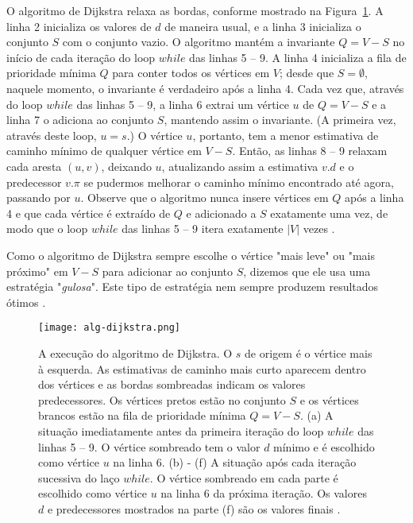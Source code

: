 O algoritmo de Dijkstra relaxa as bordas, conforme mostrado na Figura~\ref{sec3:alg-dijkstra}. A linha 2 inicializa os valores de $d$ de maneira usual, e a linha 3 inicializa o conjunto $S$ com o conjunto vazio. O algoritmo mantém a invariante $Q = V - S$ no início de cada iteração do loop $while$ das linhas 5 – 9. A linha 4 inicializa a fila de prioridade mínima $Q$ para conter todos os vértices em $V$; desde que $S = \emptyset$, naquele momento, o invariante é verdadeiro após a linha 4. Cada vez que, através do loop $while$ das linhas 5 – 9, a linha 6 extrai um vértice $u$ de $Q = V - S$ e a linha 7 o adiciona ao conjunto $S$, mantendo assim o invariante. (A primeira vez, através deste loop, $u = s$.) O vértice $u$, portanto, tem a menor estimativa de caminho mínimo de qualquer vértice em $V - S$. Então, as linhas 8 – 9 relaxam cada aresta $(u, v)$, deixando $u$, atualizando assim a estimativa $v.d$ e o predecessor $v.\pi$ se pudermos melhorar o caminho mínimo encontrado até agora, passando por $u$. Observe que o algoritmo nunca insere vértices em $Q$ após a linha 4 e que cada vértice é extraído de $Q$ e adicionado a $S$ exatamente uma vez, de modo que o loop $while$ das linhas 5 – 9 itera exatamente $\left\lvert V\right\rvert$ vezes \cite{cormen2009}.

Como o algoritmo de Dijkstra sempre escolhe o vértice "mais leve" ou "mais próximo" em $V - S$ para adicionar ao conjunto $S$, dizemos que ele usa uma estratégia "\emph{gulosa}". Este tipo de estratégia nem sempre produzem resultados ótimos \cite{cormen2009}.

\begin{figure}[!htb]
    \centering
    \texttt{[image: alg-dijkstra.png]}
    \caption{A execução do algoritmo de Dijkstra. O $s$ de origem é o vértice mais à esquerda. As estimativas de caminho mais curto aparecem dentro dos vértices e as bordas sombreadas indicam os valores predecessores. Os vértices pretos estão no conjunto $S$ e os vértices brancos estão na fila de prioridade mínima $Q = V - S$. (a) A situação imediatamente antes da primeira iteração do loop $while$ das linhas 5 – 9. O vértice sombreado tem o valor $d$ mínimo e é escolhido como vértice $u$ na linha 6. (b) - (f) A situação após cada iteração sucessiva do laço $while$. O vértice sombreado em cada parte é escolhido como vértice $u$ na linha 6 da próxima iteração. Os valores $d$ e predecessores mostrados na parte (f) são os valores finais \cite{cormen2009}.}
    \label{sec3:alg-dijkstra}
\end{figure}

